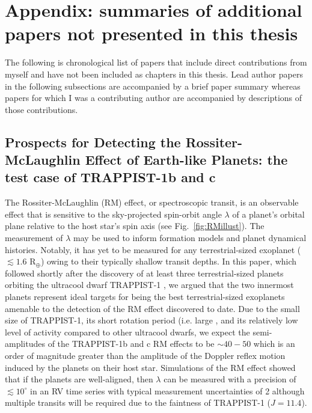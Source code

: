 \chapter[Appendix]{Appendix: summaries of additional papers not presented
  in this thesis}

The following is chronological list of papers
that include direct contributions from myself and have not been included as
chapters in this thesis. Lead author papers in the following subsections 
are accompanied by a brief paper
summary whereas papers for which I was a contributing author are accompanied by
descriptions of those contributions.

\section{Prospects for Detecting the Rossiter-McLaughlin Effect of
  Earth-like Planets: the test case of TRAPPIST-1b and c \citep{cloutier16a}}
The Rossiter-McLaughlin (RM) effect, or spectroscopic transit, is an observable
effect that is sensitive to the sky-projected spin-orbit angle $\lambda$ of a
planet's orbital plane relative to the host star's spin axis (see
Fig.~\ref{fig:RMillust}). The measurement of $\lambda$ may
be used to inform formation models and planet dynamical histories. Notably, it
has yet to be measured for any terrestrial-sized exoplanet ($\lesssim 1.6$ R$_{\oplus}$)
owing to their typically shallow transit depths. 
In this paper, which followed shortly after the discovery of at least three
terrestrial-sized planets orbiting the ultracool dwarf TRAPPIST-1 
\citep{gillon16}, we
argued that the two innermost planets represent ideal targets for being
the best terrestrial-sized exoplanets amenable to the detection of the RM effect
discovered to date.
Due to the small size of TRAPPIST-1, its short rotation period (i.e. large \vsini{)}, and its
relatively low level of activity compared to other ultracool dwarfs, we expect
the semi-amplitudes of the TRAPPIST-1b and c RM effects to be $\sim 40-50$
\mps{} which is an order of magnitude greater than the amplitude of the
Doppler reflex motion induced by the planets on their host star.
Simulations of the RM effect showed that if the planets are
well-aligned, then $\lambda$ can be measured with a precision of
$\lesssim 10^{\circ}$ in an RV time series with typical measurement
uncertainties of 2 \mps{,} although multiple transits will be required due to the faintness
of TRAPPIST-1 ($J=11.4$).

